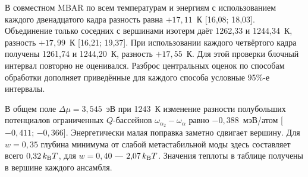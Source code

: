 В совместном MBAR по всем температурам и энергиям с использованием каждого двенадцатого кадра разность равна \(+17{,}11\)~К [16,08; 18,03]. Объединение только соседних с вершинами изотерм даёт 1262,33 и 1244,34~К, разность \(+17{,}99\)~К [16,21; 19,37]. При использовании каждого четвёртого кадра получены 1261,74 и 1244,20~К, разность \(+17{,}55\)~К. Для этой проверки блочный интервал повторно не оценивался. Разброс центральных оценок по способам обработки дополняет приведённые для каждого способа условные 95\%-е интервалы.

В общем поле \(\Delta\mu=3{,}545\)~эВ при 1243~К изменение разности полубольших потенциалов ограниченных \(Q\)-бассейнов \(\omega_{\alpha_2}-\omega_\alpha\) равно \(-0{,}388\)~мэВ/атом [\(-0{,}411\); \(-0{,}366\)]. Энергетически малая поправка заметно сдвигает вершину. Для \(w=0{,}35\) глубина минимума от слабой метастабильной моды здесь составляет всего \(0{,}32\,k_{\rm B}T\), для \(w=0{,}40\) --- \(2{,}07\,k_{\rm B}T\). Значения теплоты в таблице получены в вершине каждого ансамбля.
